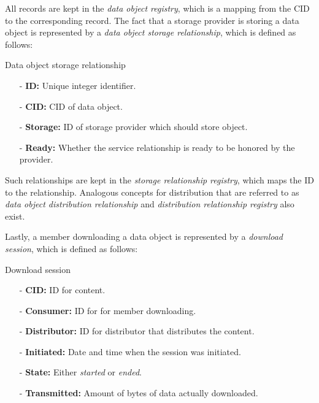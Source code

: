 \documentclass{article}
\newenvironment{concept_box}[1]
    {
    \begin{tcolorbox}
    {\large \textbf{#1} }
    }
    {
    \end{tcolorbox}
    }
\begin{document}
All records are kept in the \textit{data object registry}, which is a mapping from the CID to the corresponding record. The fact that a storage provider is storing a data object is represented by a \textit{data object storage relationship}, which is defined as follows: \\

\begin{concept_box}{Data object storage relationship}
    \begin{itemize}

      \item[-] \textbf{ID:} Unique integer identifier.

      \item[-] \textbf{CID:} CID of data object.

      \item[-] \textbf{Storage:} ID of storage provider which should store object.

      \item[-] \textbf{Ready:} Whether the service relationship is ready to be honored by the provider.

    \end{itemize}
\end{concept_box}

Such relationships are kept in the \textit{storage relationship registry}, which maps the ID to the relationship. Analogous concepts for distribution that are referred to as \textit{data object distribution relationship} and \textit{distribution relationship registry} also exist.

Lastly, a member downloading a data object is represented by a \textit{download session}, which is defined as follows: \\

\begin{concept_box}{Download session}

    \begin{itemize}

      \item[-] \textbf{CID:} ID for content.

      \item[-] \textbf{Consumer:} ID for for member downloading.

      \item[-] \textbf{Distributor:} ID for distributor that distributes the content.

      \item[-] \textbf{Initiated:} Date and time when the session was initiated.

      \item[-] \textbf{State:} Either \textit{started} or \textit{ended}.

      \item[-] \textbf{Transmitted:} Amount of bytes of data actually downloaded.

    \end{itemize}

\end{concept_box}
\end{document}
